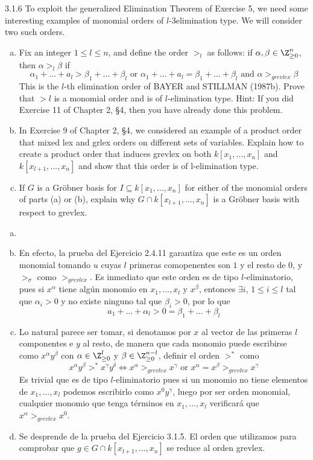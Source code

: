 \documentclass[twoside]{article}
\begin{document}
\begin{ejercicio}{3.1.6}
To exploit the generalized Elimination Theorem of Exercise 5, we need some interesting examples of monomial orders of $l$-3elimination type. We will consider two such orders.
\begin{enumerate}[a.]
\item Fix an integer $1\leq l \leq n$, and define the order $>_l$ as follows: if $\alpha,\beta \in \Z_{\geq 0}^n$, then $\alpha>_l\beta$ if
$$
\alpha_1 + \dotsc + a_l > \beta_1 + \dotsc + \beta_l \text{ or } \alpha_1 + \dotsc + a_l = \beta_1 + \dotsc + \beta_l \text{ and } \alpha >_{grevlex} \beta
$$
This is the $l$-th elimination order of BAYER and STILLMAN (1987b). Prove that $>l$ is a monomial order and is of $l$-elimination type. Hint: If you did Exercise 11 of Chapter 2,
§4, then you have already done this problem.
\item In Exercise 9 of Chapter 2, §4, we considered an example of a product order that mixed lex and grlex orders on different sets of variables. Explain how to create a product order that induces grevlex on both $k[x_{1},\dotsc, x_n]$ and $k[x_{l+1},\dotsc, x_n]$ and show that this order
is of l-elimination type.
\item If $G$ is a Gröbner basis for $I ⊆ k[x_1, . . . , x_n]$ for either of the monomial orders of parts (a) or (b), explain why $G ∩ k[x_{l+1}, . . . , x_n]$ is a Gröbner basis with respect to grevlex.
\end{enumerate}
\end{ejercicio}
\begin{solucion}
\begin{enumerate}[a.]
\item[]
\item En efecto, la prueba del Ejercicio 2.4.11 garantiza que este es un orden monomial tomando $u$ cuyas $l$ primeras comopenentes son $1$ y el resto de $0$, y $>_\sigma$ como $>_{grevlex}$. Es inmediato que este orden es de tipo $l$-eliminatorio, pues si $x^\alpha$ tiene algún monomio en $x_1,\dotsc,x_l$ y $x^\beta$, entonces $\exists i$, $1\leq i \leq l$ tal que $\alpha_i >0$ y no existe ninguno tal que $\beta_i >0$, por lo que 
$$
a_1 + \dotsc + \alpha_l > 0 = \beta_1 + \dotsc + \beta_l
$$
\item Lo natural parece ser tomar, si denotamos por $x$ al vector de las primeras $l$ componentes e $y$ al resto, de manera que cada monomio puede escribirse como $x^\alpha y^\beta$ con $\alpha\in \Z^l_{\geq0}$ y $\beta \in \Z_{\geq 0}^{n-l}$, definir el orden $>^*$ como
$$
x^\alpha y^\beta >^* x^\gamma y^\delta \Leftrightarrow x^\alpha >_{grevlex} x^\gamma \text{ or } x^\alpha = x^\beta >_{grevlex} x^\gamma
$$
Es trivial que es de tipo $l$-eliminatorio pues si un monomio no tiene elementos de $x_1,\dotsc,x_l$ podemos escribirlo como $x^0y^\gamma$, luego por ser orden monomial, cualquier monomio que tenga términos en $x_1,\dotsc,x_l$ verificará que $x^\alpha >_{grevlex}x^0$.
\item Se desprende de la prueba del Ejercicio 3.1.5. El orden que utilizamos para comprobar que $g\in G\cap k[x_{l+1},\dotsc,x_n]$ se reduce al orden grevlex.
\end{enumerate}
\end{solucion}
\end{document}
